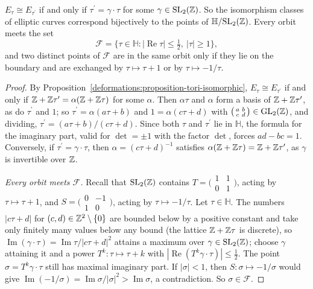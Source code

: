\begin{theorem}\label{deformations:theorem-elliptic-moduli}
$E_\tau \cong E_{\tau^{\prime}}$ if and only if $\tau^{\prime} = \gamma\cdot\tau$ for some $\gamma \in \mathrm{SL}_2(\mathbb{Z})$. So the isomorphism classes of elliptic curves correspond bijectively to the points of
$\mathbb{H}/\mathrm{SL}_2(\mathbb{Z})$. Every orbit meets the set
\[
\mathcal{F} = \{\tau \in \mathbb{H} : |\operatorname{Re}\tau| \leq \tfrac12, \ |\tau| \geq 1\},
\]
and two distinct points of $\mathcal{F}$ are in the same orbit only if they lie on the boundary and are exchanged by $\tau \mapsto \tau + 1$ or by $\tau \mapsto -1/\tau$.
\end{theorem}

\begin{proof}
By Proposition~\ref{deformations:proposition-tori-isomorphic}, $E_\tau \cong E_{\tau^{\prime}}$ if and only if $\mathbb{Z} + \mathbb{Z}\tau^{\prime} = \alpha(\mathbb{Z} + \mathbb{Z}\tau)$ for some $\alpha$. Then $\alpha\tau$ and $\alpha$ form a basis of
$\mathbb{Z} + \mathbb{Z}\tau^{\prime}$, as do $\tau^{\prime}$ and $1$; so $\tau^{\prime} = \alpha(a\tau + b)$ and $1 = \alpha(c\tau + d)$ with $\bigl(\begin{smallmatrix}a & b\\ c & d\end{smallmatrix}\bigr) \in \mathrm{GL}_2(\mathbb{Z})$, and dividing,
$\tau^{\prime} = (a\tau + b)/(c\tau + d)$. Since both $\tau$ and $\tau^{\prime}$ lie in $\mathbb{H}$, the formula for the imaginary part, valid for $\det = \pm1$ with the factor $\det$, forces $ad - bc = 1$. Conversely, if
$\tau^{\prime} = \gamma\cdot\tau$, then $\alpha = (c\tau + d)^{-1}$ satisfies $\alpha(\mathbb{Z} + \mathbb{Z}\tau) = \mathbb{Z} + \mathbb{Z}\tau^{\prime}$, as $\gamma$ is invertible over $\mathbb{Z}$.

\emph{Every orbit meets $\mathcal{F}$.} Recall that $\mathrm{SL}_2(\mathbb{Z})$ contains $T = \bigl(\begin{smallmatrix}1 & 1\\ 0 & 1\end{smallmatrix}\bigr)$, acting by $\tau \mapsto \tau + 1$, and
$S = \bigl(\begin{smallmatrix}0 & -1\\ 1 & 0\end{smallmatrix}\bigr)$, acting by $\tau \mapsto -1/\tau$. Let $\tau \in \mathbb{H}$. The numbers $|c\tau + d|$ for $(c, d) \in \mathbb{Z}^2 \setminus \{0\}$ are bounded below by a positive constant and take only finitely many values below
any bound (the lattice $\mathbb{Z} + \mathbb{Z}\tau$ is discrete), so $\operatorname{Im}(\gamma\cdot\tau) = \operatorname{Im}\tau/|c\tau + d|^2$ attains a maximum over $\gamma \in \mathrm{SL}_2(\mathbb{Z})$; choose $\gamma$ attaining it and a
power $T^k \colon \tau \mapsto \tau + k$ with $|\operatorname{Re}(T^k\gamma\cdot\tau)| \leq \frac12$. The point $\sigma = T^k\gamma\cdot\tau$ still has maximal imaginary part. If $|\sigma| < 1$, then $S \colon \sigma \mapsto -1/\sigma$
would give $\operatorname{Im}(-1/\sigma) = \operatorname{Im}\sigma/|\sigma|^2 > \operatorname{Im}\sigma$, a contradiction. So $\sigma \in \mathcal{F}$.


\end{proof}
